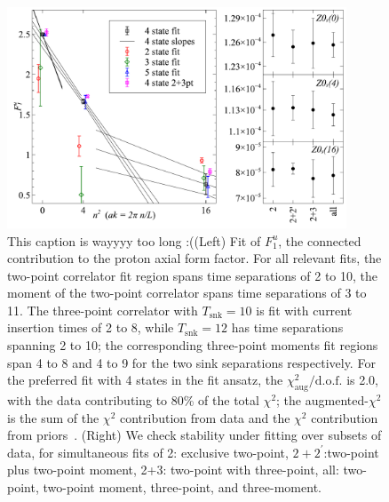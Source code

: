 \documentclass{PoS}
\begin{document}
\begin{figure}[h]
	\centering
		\includegraphics[width=0.9\textwidth]{./gV.pdf}
	\caption{{\color{red} This caption is wayyyy too long :(}(Left) Fit of $F_1^u$, the connected contribution to the proton axial form factor. For all relevant fits, the two-point correlator fit region spans time separations of 2 to 10, the moment of the two-point correlator spans time separations of 3 to 11. The three-point correlator with $T_{\text{snk}}=10$ is fit with current insertion times of 2 to 8, while $T_{\text{snk}}=12$ has time separations spanning 2 to 10; the corresponding three-point moments fit regions span 4 to 8 and 4 to 9 for the two sink separations respectively. For the preferred fit with 4 states in the fit ansatz, the $\chi^2_\text{aug}/\text{d.o.f.}$ is 2.0, with the data contributing to 80\% of the total $\chi^2$; the augmented-$\chi^2$ is the sum of the $\chi^2$ contribution from data and the $\chi^2$ contribution from priors~\cite{Lepage:2001ym}. (Right) We check stability under fitting over subsets of data, for simultaneous fits of 2: exclusive two-point, $2+2^\prime$:two-point plus two-point moment, 2+3: two-point with three-point, all: two-point, two-point moment, three-point, and three-moment.}
	\label{fig:gV}
\end{figure}
\end{document}
